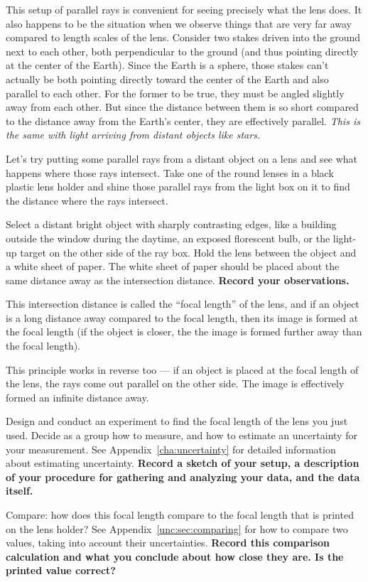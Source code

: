 This setup of parallel rays is convenient for seeing precisely what the lens does. It also happens to be the situation when we observe things that are very far away compared to length scales of the lens. Consider two stakes driven into the ground next to each other, both perpendicular to the ground (and thus pointing directly at the center of the Earth). Since the Earth is a sphere, those stakes can't actually be both pointing directly toward the center of the Earth and also parallel to each other. For the former to be true, they must be angled slightly away from each other. But since the distance between them is so short compared to the distance away from the Earth's center, they are effectively parallel. \textit{This is the same with light arriving from distant objects like stars.}

\begin{steps}
	\item Let's try putting some parallel rays from a distant object on a lens and see what happens where those rays intersect. Take one of the round lenses in a black plastic lens holder and shine those parallel rays from the light box on it to find the distance where the rays intersect.
	
	\item Select a distant bright object with sharply contrasting edges, like a building outside the window during the daytime, an exposed florescent bulb, or the light-up target on the other side of the ray box. Hold the lens between the object and a white sheet of paper. The white sheet of paper should be placed about the same distance away as the intersection distance. \textbf{Record your observations.}
\end{steps}

This intersection distance is called the ``focal length'' of the lens, and if an object is a long distance away compared to the focal length, then its image is formed at the focal length (if the object is closer, the the image is formed further away than the focal length).

This principle works in reverse too --- if an object is placed at the focal length of the lens, the rays come out parallel on the other side. The image is effectively formed an infinite distance away.

\begin{steps}
	\item Design and conduct an experiment to find the focal length of the lens you just used. Decide as a group how to measure, and how to estimate an uncertainty for your measurement. See Appendix\ \ref{cha:uncertainty} for detailed information about estimating uncertainty. \textbf{Record a sketch of your setup, a description of your procedure for gathering and analyzing your data, and the data itself.}

	\item Compare: how does this focal length compare to the focal length that is printed on the lens holder? See Appendix\ \ref{unc:sec:comparing} for how to compare two values, taking into account their uncertainties. \textbf{Record this comparison calculation and what you conclude about how close they are. Is the printed value correct?}
\end{steps}

